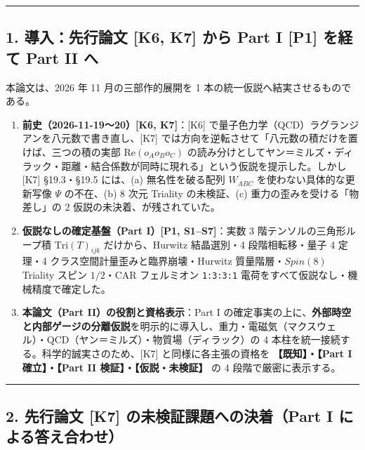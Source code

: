 \documentclass[
  a4paper,
]{ltjsarticle}
\providecommand{\tightlist}{%
  \setlength{\itemsep}{0pt}\setlength{\parskip}{0pt}}
\begin{document}
\begin{center}\rule{0.5\linewidth}{0.5pt}\end{center}

\subsection{1. 導入：先行論文 {[}K6, K7{]} から Part I {[}P1{]} を経て
Part II
へ}\label{ux5c0eux5165ux5148ux884cux8ad6ux6587-k6-k7-ux304bux3089-part-i-p1-ux3092ux7d4cux3066-part-ii-ux3078}

本論文は、2026 年 11 月の三部作的展開を 1
本の統一仮説へ結実させるものである。

\begin{enumerate}
\def\labelenumi{\arabic{enumi}.}
\tightlist
\item
  \textbf{前史（2026-11-19〜20）{[}K6, K7{]}}：{[}K6{]}
  で量子色力学（QCD）ラグランジアンを八元数で書き直し、{[}K7{]}
  では方向を逆転させて「八元数の積だけを置けば、三つの積の実部
  \(\mathrm{Re}(o_A o_B o_C)\)
  の読み分けとしてヤン＝ミルズ・ディラック・距離・結合係数が同時に現れる」という仮説を提示した。しかし
  {[}K7{]} §19.3・§19.5 には、(a) 無名性を破る配列 \(W_{ABC}\)
  を使わない具体的な更新写像 \(\Psi\) の不在、(b) 8 次元 Triality
  の未検証、(c) 重力の歪みを受ける「物差し」の 2
  仮説の未決着、が残されていた。
\item
  \textbf{仮説なしの確定基盤（Part I）{[}P1, S1--S7{]}}：実数 3
  階テンソルの三角形ループ積 \(\mathrm{Tri}(T)_{ijk}\) だけから、Hurwitz
  結晶選別・4 段階相転移・量子 4 定理・4
  クラス空間計量歪みと臨界崩壊・Hurwitz 質量階層・\(Spin(8)\) Triality
  スピン \(1/2\)・CAR フェルミオン \texttt{1:3:3:1}
  電荷をすべて仮説なし・機械精度で確定した。
\item
  \textbf{本論文（Part II）の役割と資格表示}：Part I
  の確定事実の上に、\textbf{外部時空と内部ゲージの分離仮説}を明示的に導入し、重力・電磁気（マクスウェル）・QCD（ヤン＝ミルズ）・物質場（ディラック）の
  4 本柱を統一接続する。科学的誠実さのため、{[}K7{]}
  と同様に各主張の資格を \textbf{【既知】・【Part I 確立】・【Part II
  検証】・【仮説・未検証】} の 4 段階で厳密に表示する。
\end{enumerate}

\begin{center}\rule{0.5\linewidth}{0.5pt}\end{center}

\subsection{2. 先行論文 {[}K7{]} の未検証課題への決着（Part I
による答え合わせ）}\label{ux5148ux884cux8ad6ux6587-k7-ux306eux672aux691cux8a3cux8ab2ux984cux3078ux306eux6c7aux7740part-i-ux306bux3088ux308bux7b54ux3048ux5408ux308fux305b}
\end{document}
